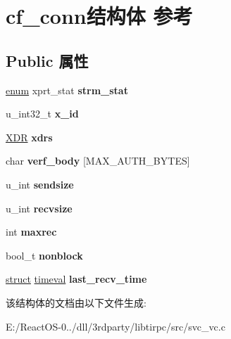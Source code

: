 \hypertarget{structcf__conn}{}\section{cf\+\_\+conn结构体 参考}
\label{structcf__conn}
\subsection*{Public 属性}
\begin{DoxyCompactItemize}
\item 
\mbox{\label{structcf__conn_a0beca40b4586c4f183f146517d9169ba}} 
\hyperlink{interfaceenum}{enum} xprt\+\_\+stat {\bfseries strm\+\_\+stat}
\item 
\mbox{\label{structcf__conn_ace3eab708712be65f33a4c29703a2d6a}} 
u\+\_\+int32\+\_\+t {\bfseries x\+\_\+id}
\item 
\mbox{\label{structcf__conn_ad06330298f7ad090bca76692040a7dac}} 
\hyperlink{struct____rpc__xdr}{X\+DR} {\bfseries xdrs}
\item 
\mbox{\label{structcf__conn_a4130babcac6eb48372c52f2cb18175fc}} 
char {\bfseries verf\+\_\+body} \mbox{[}M\+A\+X\+\_\+\+A\+U\+T\+H\+\_\+\+B\+Y\+T\+ES\mbox{]}
\item 
\mbox{\label{structcf__conn_ab016793f0bccf5382fc42a25499868ef}} 
u\+\_\+int {\bfseries sendsize}
\item 
\mbox{\label{structcf__conn_a08f9b1a9e8c8f9d973581d1fa45288bf}} 
u\+\_\+int {\bfseries recvsize}
\item 
\mbox{\label{structcf__conn_a116817254ba7982290fb06f06ec5cf75}} 
int {\bfseries maxrec}
\item 
\mbox{\label{structcf__conn_ae8381ead65b72d9dd8d4fb358709a66e}} 
bool\+\_\+t {\bfseries nonblock}
\item 
\mbox{\label{structcf__conn_a3ff197ab4b84c576113dd285764ffa95}} 
\hyperlink{interfacestruct}{struct} \hyperlink{structtimeval}{timeval} {\bfseries last\+\_\+recv\+\_\+time}
\end{DoxyCompactItemize}


该结构体的文档由以下文件生成\+:\begin{DoxyCompactItemize}
\item 
E\+:/\+React\+O\+S-\/0../dll/3rdparty/libtirpc/src/svc\+\_\+vc.\+c\end{DoxyCompactItemize}
